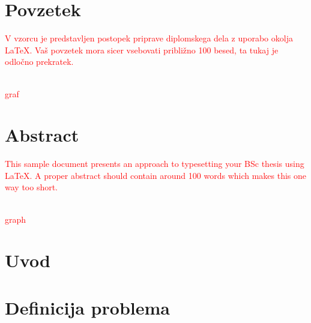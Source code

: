 \documentclass[a4paper, 12pt, ]{book}
\newcommand{\TODO}[1]{\textcolor{red}{#1}}
\newcommand{\clearemptydoublepage}{\newpage{\pagestyle{empty}\cleardoublepage}}
\begin{document}
	
	
	
	\chapter*{Povzetek}
	\TODO{V vzorcu je predstavljen postopek priprave diplomskega dela z uporabo okolja \LaTeX.
	Vaš povzetek mora sicer vsebovati približno 100 besed, ta tukaj je odločno prekratek.}
	
	\vspace{2cm}
	\\
	\TODO{graf}
	
	
	\clearemptydoublepage
	
	
	
	
	
	\chapter*{Abstract}
	\TODO{This sample document presents an approach to typesetting your BSc thesis using \LaTeX. A 
	proper abstract should contain around 100 words which makes this one way too short.}
	
	\vspace{2cm}
	\\
	\TODO{graph}
	
	\clearemptydoublepage




\mainmatter
\setcounter{page}{1}
\pagestyle{fancy}



\chapter{Uvod}




\chapter{Definicija problema}
\end{document}
